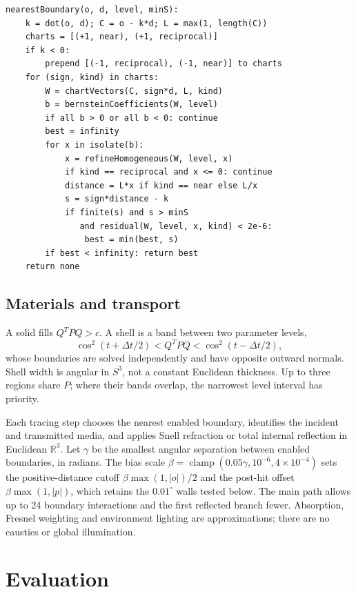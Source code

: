 \documentclass{jcgt}
\begin{document}
\begin{lstlisting}[caption={Nearest finite intersection with one boundary (Section~\ref{isolation-refinement-and-acceptance}).}, label=lst:intersection]
nearestBoundary(o, d, level, minS):
    k = dot(o, d); C = o - k*d; L = max(1, length(C))
    charts = [(+1, near), (+1, reciprocal)]
    if k < 0:
        prepend [(-1, reciprocal), (-1, near)] to charts
    for (sign, kind) in charts:
        W = chartVectors(C, sign*d, L, kind)
        b = bernsteinCoefficients(W, level)
        if all b > 0 or all b < 0: continue
        best = infinity
        for x in isolate(b):
            x = refineHomogeneous(W, level, x)
            if kind == reciprocal and x <= 0: continue
            distance = L*x if kind == near else L/x
            s = sign*distance - k
            if finite(s) and s > minS
               and residual(W, level, x, kind) < 2e-6:
                best = min(best, s)
        if best < infinity: return best
    return none
\end{lstlisting}

\subsection{Materials and transport}\label{materials-and-transport}

A solid fills \(Q^TPQ>c\). A shell is a band between two parameter
levels, \[
\cos^2(t+\Delta t/2)<Q^TPQ<\cos^2(t-\Delta t/2),
\] whose boundaries are solved independently and have opposite outward
normals. Shell width is angular in \(S^3\), not a constant Euclidean
thickness. Up to three regions share \(P\); where their bands overlap,
the narrowest level interval has priority.

Each tracing step chooses the nearest enabled boundary, identifies the
incident and transmitted media, and applies Snell refraction or total
internal reflection in Euclidean \(\mathbb R^3\). Let \(\gamma\) be the
smallest angular separation between enabled boundaries, in radians. The
bias scale
\(\beta=\operatorname{clamp}(0.05\gamma,10^{-6},4\times10^{-4})\) sets
the positive-distance cutoff \(\beta\max(1,|o|)/2\) and the post-hit
offset \(\beta\max(1,|p|)\), which retains the \(0.01^\circ\) walls
tested below. The main path allows up to 24 boundary interactions and
the first reflected branch fewer. Absorption, Fresnel weighting and
environment lighting are approximations; there are no caustics or global
illumination.

\section{Evaluation}\label{evaluation}
\end{document}
